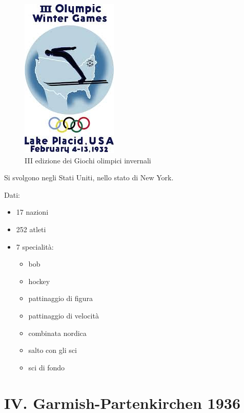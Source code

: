 \documentclass[
]{book}
\providecommand{\tightlist}{%
  \setlength{\itemsep}{0pt}\setlength{\parskip}{0pt}}
\begin{document}
\begin{figure}
\includegraphics[width=0.4\linewidth]{images/loghi/1932} \caption{III edizione dei Giochi olimpici invernali}\label{fig:unnamed-chunk-10}
\end{figure}

Si svolgono negli Stati Uniti, nello stato di New York.

Dati:

\begin{itemize}
\tightlist
\item
  17 nazioni
\item
  252 atleti
\item
  7 specialità:

  \begin{itemize}
  \tightlist
  \item
    bob
  \item
    hockey
  \item
    pattinaggio di figura
  \item
    pattinaggio di velocità
  \item
    combinata nordica
  \item
    salto con gli sci
  \item
    sci di fondo
  \end{itemize}
\end{itemize}

\chapter*{IV. Garmish-Partenkirchen 1936}\label{iv.-garmish-partenkirchen-1936}
\end{document}
